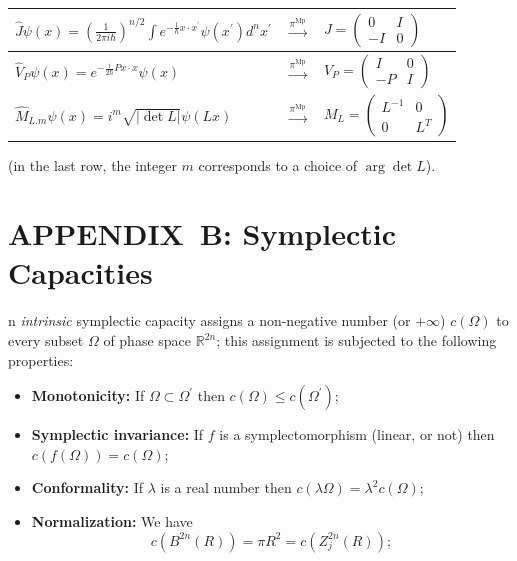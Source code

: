 \documentclass[11pt]{article}%
\begin{document}
\begin{center}%
\begin{tabular}
[c]{|l|l|l|}\hline
$\widehat{J}\psi(x)=\left(  \tfrac{1}{2\pi i\hbar}\right)  ^{n/2}\int
e^{-\frac{1}{\hbar}x\cdot x^{\prime}}\psi(x^{\prime})d^{n}x^{\prime}$ &
$\overset{\pi^{\operatorname*{Mp}}}{\longrightarrow}$ & $J=%
\begin{pmatrix}
0 & I\\
-I & 0
\end{pmatrix}
$\\\hline
$\widehat{V}_{P}\psi(x)=e^{-\frac{i}{2\hbar}Px\cdot x}\psi(x)$ &
$\overset{\pi^{\operatorname*{Mp}}}{\longrightarrow}$ & $V_{P}=%
\begin{pmatrix}
I & 0\\
-P & I
\end{pmatrix}
$\\\hline
$\widehat{M}_{L.m}\psi(x)=i^{m}\sqrt{|\det L|}\psi(Lx)$ & $\overset{\pi
^{\operatorname*{Mp}}}{\longrightarrow}$ & $M_{L}=%
\begin{pmatrix}
L^{-1} & 0\\
0 & L^{T}%
\end{pmatrix}
$\\\hline
\end{tabular}



\end{center}

(in the last row, the integer $m$ corresponds to a choice of $\arg\det L$).

\section*{APPENDIX\ B: Symplectic Capacities}

n \textit{intrinsic} symplectic capacity assigns a non-negative number (or
$+\infty$) $c(\Omega)$ to every subset $\Omega$ of phase space $\mathbb{R}%
^{2n}$; this assignment is subjected to the following properties:

\begin{itemize}
\item \textbf{Monotonicity:} If $\Omega\subset\Omega^{\prime}$ then
$c(\Omega)\leq c(\Omega^{\prime})$;

\item \textbf{Symplectic invariance:} If $f$ is a symplectomorphism (linear,
or not) then $c(f(\Omega))=c(\Omega)$;

\item \textbf{Conformality:} If $\lambda$ is a real number then $c(\lambda
\Omega)=\lambda^{2}c(\Omega)$;

\item \textbf{Normalization:} We have
\[
c(B^{2n}(R))=\pi R^{2}=c(Z_{j}^{2n}(R));
\]

\end{itemize}
\end{document}
